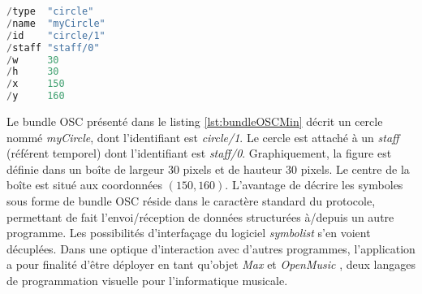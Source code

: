 \begin{lstlisting}[language=java, 
				   caption={Messages OSC \'{e}l\'{e}mentaires pour les symboles d'une partition \textit{symbolist}}, 
				   label={lst:bundleOSCMin}, 
				   captionpos={b}, 
				   numbers=none]
/type  "circle"
/name  "myCircle"
/id    "circle/1"
/staff "staff/0"
/w     30
/h     30
/x     150
/y     160 
\end{lstlisting}

Le bundle OSC présenté dans le listing \ref{lst:bundleOSCMin} décrit un cercle nommé \textit{myCircle}, dont l'identifiant est \textit{circle/1}. Le cercle est attaché à un \textit{staff} (référent temporel) dont l'identifiant est \textit{staff/0}. Graphiquement, la figure est définie dans un boîte de largeur 30 pixels et de hauteur 30 pixels. Le centre de la boîte est situé aux coordonnées $(150, 160)$.
L'avantage de décrire les symboles sous forme de bundle OSC réside dans le caractère standard du protocole, permettant de fait l'envoi/réception de données structurées à/depuis un autre programme. Les possibilités d'interfaçage du logiciel \textit{symbolist} s'en voient décuplées.
Dans une optique d'interaction avec d'autres programmes, l'application a pour finalité d'être déployer en tant qu'objet \textit{Max} \cite{puckette1991} et \textit{OpenMusic} \cite{agon1998}, deux langages de programmation visuelle pour l'informatique musicale.  



        
   